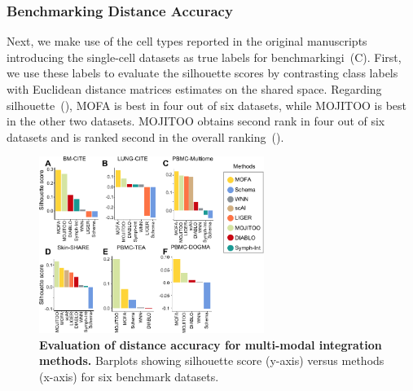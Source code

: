 \subsubsection{Benchmarking Distance Accuracy}
Next, we make use of the cell types reported in the original manuscripts introducing the single-cell datasets as true labels for benchmarkingi~(C). First, we use these labels to evaluate the silhouette scores by contrasting class labels with Euclidean distance matrices estimates on the shared space. Regarding silhouette~(), MOFA is best in four out of six datasets, while MOJITOO is best in the other two datasets. MOJITOO obtains second rank in four out of six datasets and is ranked second in the overall ranking~(). 
\begin{figure}[!ht]
	\centering
	\includegraphics[width=0.65\textwidth]{silouette/fig}
	\vspace{0.1cm}
	\caption[Evaluation of distance accuracy for multi-modal integration methods.]{
        \textbf{Evaluation of distance accuracy for multi-modal integration methods.} Barplots showing silhouette score (y-axis) versus methods (x-axis) for six benchmark datasets. }
	\label{fig:silouette}
\end{figure}


